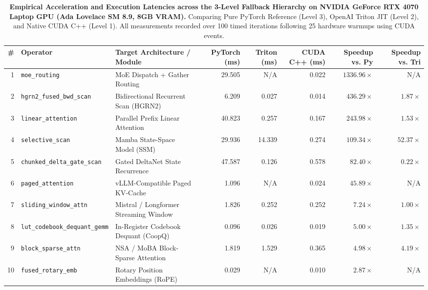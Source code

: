 \begin{table}[t]
\centering
\caption{\textbf{Empirical Acceleration and Execution Latencies across the 3-Level Fallback Hierarchy on NVIDIA GeForce RTX 4070 Laptop GPU (Ada Lovelace SM 8.9, 8GB VRAM).}
Comparing Pure PyTorch Reference (Level 3), OpenAI Triton JIT (Level 2), and Native CUDA C++ (Level 1). All measurements recorded over 100 timed iterations following 25 hardware warmups using CUDA events.}
\label{tab:18_native_cuda_kernels_3level}
\scriptsize
\setlength{\tabcolsep}{3.5pt}
\begin{tabular}{rllrrrrr}
\toprule
\textbf{\#} & \textbf{Operator} & \textbf{Target Architecture / Module} & \textbf{PyTorch (ms)} & \textbf{Triton (ms)} & \textbf{CUDA C++ (ms)} & \textbf{Speedup vs. Py} & \textbf{Speedup vs. Tri} \\
\midrule
1 & \texttt{moe\_routing} & MoE Dispatch + Gather Routing & 29.505 & N/A & 0.022 & $\mathbf{1336.96\times}$ & N/A \\
2 & \texttt{hgrn2\_fused\_bwd\_scan} & Bidirectional Recurrent Scan (HGRN2) & 6.209 & 0.027 & 0.014 & $\mathbf{436.29\times}$ & $\mathbf{1.87\times}$ \\
3 & \texttt{linear\_attention} & Parallel Prefix Linear Attention & 40.823 & 0.257 & 0.167 & $\mathbf{243.98\times}$ & $\mathbf{1.53\times}$ \\
4 & \texttt{selective\_scan} & Mamba State-Space Model (SSM) & 29.936 & 14.339 & 0.274 & $\mathbf{109.34\times}$ & $\mathbf{52.37\times}$ \\
5 & \texttt{chunked\_delta\_gate\_scan} & Gated DeltaNet State Recurrence & 47.587 & 0.126 & 0.578 & $\mathbf{82.40\times}$ & $0.22\times$ \\
6 & \texttt{paged\_attention} & vLLM-Compatible Paged KV-Cache & 1.096 & N/A & 0.024 & $\mathbf{45.89\times}$ & N/A \\
7 & \texttt{sliding\_window\_attn} & Mistral / Longformer Streaming Window & 1.826 & 0.252 & 0.252 & $\mathbf{7.24\times}$ & $1.00\times$ \\
8 & \texttt{lut\_codebook\_dequant\_gemm} & In-Register Codebook Dequant (CoopQ) & 0.096 & 0.026 & 0.019 & $\mathbf{5.00\times}$ & $\mathbf{1.35\times}$ \\
9 & \texttt{block\_sparse\_attn} & NSA / MoBA Block-Sparse Attention & 1.819 & 1.529 & 0.365 & $\mathbf{4.98\times}$ & $\mathbf{4.19\times}$ \\
10 & \texttt{fused\_rotary\_emb} & Rotary Position Embeddings (RoPE) & 0.029 & N/A & 0.010 & $\mathbf{2.87\times}$ & N/A \\

\end{tabular}
\end{table}
